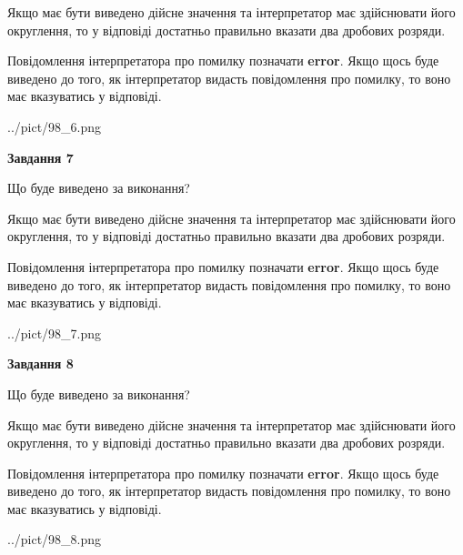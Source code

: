 \documentclass[12pt, ukrainian]{article}
\begin{document}
{\begin {Large}
Якщо має бути виведено дійсне значення та інтерпретатор має здійснювати його округлення, 
то у відповіді достатньо правильно вказати два дробових розряди.

Повідомлення інтерпретатора про помилку позначати \textbf{error}.
Якщо щось буде виведено до того, як інтерпретатор видасть повідомлення про помилку, 
то воно має вказуватись у відповіді. \par

\begin{center}
	{../pict/98_6.png}
\end{center}
\newpage

{\begin {center}\textbf{Завдання 7}\end {center}}\par
Що буде виведено за виконання? \par

Якщо має бути виведено дійсне значення та інтерпретатор має здійснювати його округлення, 
то у відповіді достатньо правильно вказати два дробових розряди.

Повідомлення інтерпретатора про помилку позначати \textbf{error}.
Якщо щось буде виведено до того, як інтерпретатор видасть повідомлення про помилку, 
то воно має вказуватись у відповіді. \par

\begin{center}
	{../pict/98_7.png}
\end{center}
\newpage

{\begin {center}\textbf{Завдання 8}\end {center}}\par
Що буде виведено за виконання? \par

Якщо має бути виведено дійсне значення та інтерпретатор має здійснювати його округлення, 
то у відповіді достатньо правильно вказати два дробових розряди.

Повідомлення інтерпретатора про помилку позначати \textbf{error}.
Якщо щось буде виведено до того, як інтерпретатор видасть повідомлення про помилку, 
то воно має вказуватись у відповіді. \par

\begin{center}
	{../pict/98_8.png}
\end{center}
\newpage


\end{Large}}
\end{document}
